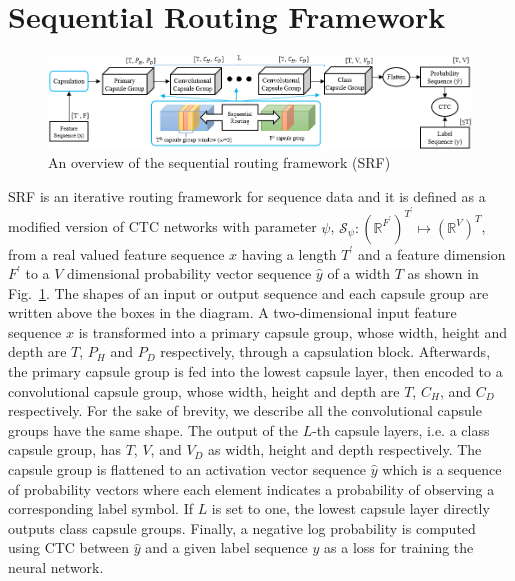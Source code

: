 \documentclass[review]{elsarticle}
\begin{document}
\section{Sequential Routing Framework}
\begin{figure}[ht!]
  \includegraphics[trim={0 0cm 0 0cm}, clip, width=1.0 \linewidth]{01_overview.jpg}
  \caption{An overview of the sequential routing framework (SRF)}
  \label{fig:diagram}
\end{figure}
SRF is an iterative routing framework for sequence data and it is defined as a modified version of CTC networks with parameter $\psi$, $\mathcal{S}_\psi: (\mathbb{R}^{F^\prime})^{T^\prime} \mapsto (\mathbb{R}^V)^T$, from a real valued feature sequence $x$ having a length $T^\prime$ and a feature dimension $F^\prime$ to a $V$ dimensional probability vector sequence $\hat{y}$ of a width $T$ as shown in Fig.~\ref{fig:diagram}.
The shapes of an input or output sequence and each capsule group are written above the boxes in the diagram.
A two-dimensional input feature sequence $x$ is transformed into a primary capsule group, whose width, height and depth are $T$, $P_H$ and $P_D$ respectively, through a capsulation block.
Afterwards, the primary capsule group is fed into the lowest capsule layer, then encoded to a convolutional capsule group, whose width, height and depth are $T$, $C_H$, and $C_D$ respectively.
For the sake of brevity, we describe all the convolutional capsule groups have the same shape.
The output of the $L$-th capsule layers, i.e. a class capsule group, has $T$, $V$, and $V_D$ as width, height and depth respectively.
The capsule group is flattened to an activation vector sequence $\hat{y}$ which is a sequence of probability vectors where each element indicates a probability of observing a corresponding label symbol.
If $L$ is set to one, the lowest capsule layer directly outputs class capsule groups.
Finally, a negative log probability is computed using CTC between $\hat{y}$ and a given label sequence $y$ as a loss for training the neural network.
\end{document}
